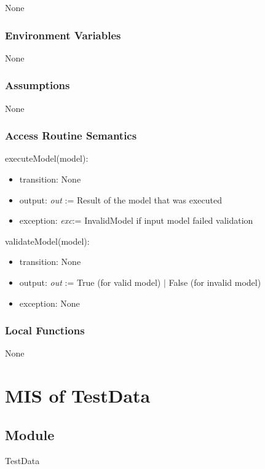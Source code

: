 \documentclass[12pt, titlepage]{article}
\begin{document}
None

\subsubsection{Environment Variables}

None

\subsubsection{Assumptions}

None

\subsubsection{Access Routine Semantics}

\noindent executeModel(model):
\begin{itemize}
\item transition: None
\item output: \textit{out} := Result of the model that was executed
\item exception: \textit{exc}:= InvalidModel if input model failed validation
\end{itemize}

\noindent validateModel(model):
\begin{itemize}
\item transition: None
\item output: \textit{out} := True (for valid model) $|$ False (for invalid model)
\item exception: None
\end{itemize}

\subsubsection{Local Functions}

None

\newpage

\section{MIS of TestData} \label{TestDataModule}

\subsection{Module}

TestData
\end{document}
